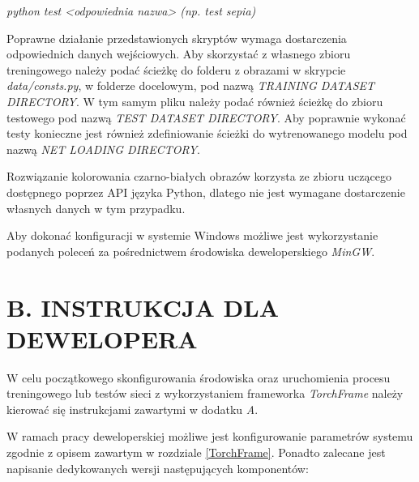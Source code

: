   \textit{python test <odpowiednia nazwa> (np. test sepia)}

  Poprawne działanie przedstawionych skryptów wymaga dostarczenia odpowiednich
  danych wejściowych. Aby skorzystać z własnego zbioru treningowego należy podać
  ścieżkę do folderu z obrazami w skrypcie \textit{data/consts.py}, w folderze docelowym,
  pod nazwą \textit{TRAINING DATASET DIRECTORY}. W tym samym pliku należy podać
  również ścieżkę do zbioru testowego pod nazwą \textit{TEST DATASET DIRECTORY}.
  Aby poprawnie wykonać testy konieczne jest również zdefiniowanie ścieżki do
  wytrenowanego modelu pod nazwą \textit{NET LOADING DIRECTORY}.

  Rozwiązanie kolorowania czarno-białych obrazów korzysta ze zbioru uczącego
  dostępnego poprzez API języka Python, dlatego nie jest wymagane dostarczenie
  własnych danych w tym przypadku.

  Aby dokonać konfiguracji w systemie Windows możliwe jest wykorzystanie
  podanych poleceń za pośrednictwem środowiska deweloperskiego \textit{MinGW}.

\section*{B. INSTRUKCJA DLA DEWELOPERA}

  W celu początkowego skonfigurowania środowiska oraz uruchomienia procesu
  treningowego lub testów sieci z wykorzystaniem frameworka \textit{TorchFrame}
  należy kierować się instrukcjami zawartymi w dodatku \textit{A}.

  W ramach pracy deweloperskiej możliwe jest konfigurowanie parametrów systemu
  zgodnie z opisem zawartym w rozdziale \ref{TorchFrame}. Ponadto zalecane jest
  napisanie dedykowanych wersji następujących komponentów:


